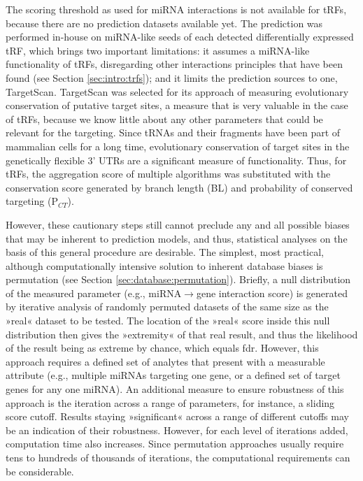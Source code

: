 The scoring threshold as used for miRNA interactions is not available for tRFs, because there are no prediction datasets available yet. The prediction was performed in-house on miRNA-like seeds of each detected differentially expressed tRF, which brings two important limitations: it assumes a miRNA-like functionality of tRFs, disregarding other interactions principles that have been found (see Section \ref{sec:intro:trfs}); and it limits the prediction sources to one, TargetScan.\cite{Friedman2009} TargetScan was selected for its approach of measuring evolutionary conservation of putative target sites, a measure that is very valuable in the case of tRFs, because we know little about any other parameters that could be relevant for the targeting. Since tRNAs and their fragments have been part of mammalian cells for a long time, evolutionary conservation of target sites in the genetically flexible 3' UTRs are a significant measure of functionality.\cite{Agarwal2015} Thus, for tRFs, the aggregation score of multiple algorithms was substituted with the conservation score generated by branch length (BL) and probability of conserved targeting (P$_{CT}$).\cite{Agarwal2015}

However, these cautionary steps still cannot preclude any and all possible biases that may be inherent to prediction models, and thus, statistical analyses on the basis of this general procedure are desirable. The simplest, most practical, although computationally intensive solution to inherent database biases is permutation (see Section \ref{sec:database:permutation}). Briefly, a null distribution of the measured parameter (e.g., miRNA$\to$gene interaction score) is generated by iterative analysis of randomly permuted datasets of the same size as the »real« dataset to be tested. The location of the »real« score inside this null distribution then gives the »extremity« of that real result, and thus the likelihood of the result being as extreme by chance, which equals \ac{fdr}. However, this approach requires a defined set of analytes that present with a measurable attribute (e.g., multiple miRNAs targeting one gene, or a defined set of target genes for any one miRNA). An additional measure to ensure robustness of this approach is the iteration across a range of parameters, for instance, a sliding score cutoff. Results staying »significant« across a range of different cutoffs may be an indication of their robustness. However, for each level of iterations added, computation time also increases. Since permutation approaches usually require tens to hundreds of thousands of iterations, the computational requirements can be considerable.

